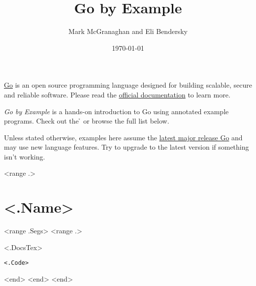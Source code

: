 \documentclass[12pt]{article}
\begin{document}
\title{Go by Example}
\author{Mark McGranaghan and Eli Bendersky}
\date{\today}
\maketitle

\href{https://go.dev}{Go} is an open source programming language designed for building scalable, secure and reliable software.
Please read the \href{https://go.dev/doc/tutorial/getting-started}{official documentation} to learn more.


\textit{Go by Example} is a hands-on introduction to Go using annotated example programs.
Check out the \h{} or browse the full list below.


Unless stated otherwise, examples here assume the \href{https://go.dev/doc/devel/release}{latest major release Go} and may use new language features.
Try to upgrade to the latest version if something isn't working.


\begin{multicols}{2}
\tableofcontents
\end{multicols}

<range .>
\newpage
\section{<.Name>}
\label{sec:<.ID>}
  <range .Segs>
    <range .>
\begin{paracol}{2}\begin{leftcolumn}\sloppy
<.DocsTex>
\end{leftcolumn}\begin{rightcolumn}\begin{lstlisting}
<.Code>
\end{lstlisting}\end{rightcolumn}\end{paracol}
    <end>
  <end>
<end>
\end{document}
